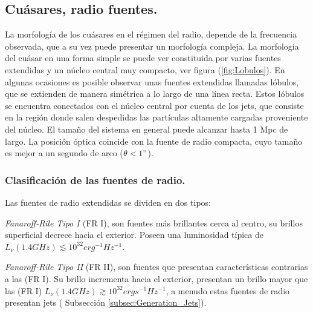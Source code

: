 	\subsection{Cuásares, radio fuentes.}
	\label{subsec:}

La morfología de los cuásares en el régimen del radio, depende de la frecuencia observada, que a su vez puede presentar un morfología compleja. La morfología del cuásar en una forma simple se puede ver  constituida por varias fuentes extendidas y un núcleo central muy compacto, ver figura (\ref{fig:Lobulos}). En algunas ocasiones es posible observar unas fuentes extendidas llamadas lóbulos, que se extienden de manera simétrica a lo largo de una línea recta. Estos lóbulos se encuentra conectados con el núcleo central por cuenta de los jets, que consiste en la región donde salen despedidas las partículas altamente cargadas proveniente del núcleo. El tamaño del sistema en general puede alcanzar hasta 1 Mpc de largo. La posición óptica coincide con la fuente de radio compacta, cuyo tamaño es mejor a un segundo de arco ($\theta < 1"$).

	\subsubsection{Clasificación de las fuentes de radio.}
	\label{subsubsec: clasification_source_radio}

Las fuentes de radio extendidas se dividen en dos tipos:

{\it{Fanaroff-Rile Tipo I }} (FR I), son fuentes más brillantes cerca al centro, su brillos superficial decrece hacia el exterior. Poseen una luminosidad típica de $L_{\nu}(1.4GHz)\lesssim 10^{32} erg^{-1} Hz^{-1}$.

{\it{Fanaroff-Rile Tipo II}} (FR II), son fuentes que presentan características contrarias a las (FR I). Su brillo incrementa hacia el exterior, presentan un brillo mayor que las (FR I) $L_{\nu}(1.4GHz)\gtrsim 10^{32} ergs^{-1}Hz^{-1}$, a menudo estas fuentes de radio presentan jets ( Subsección \ref{subsec:Generation_Jets}).



